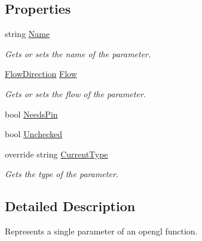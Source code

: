 \subsection*{Properties}
\begin{DoxyCompactItemize}
\item 
string \hyperlink{class_bind_1_1_structures_1_1_parameter_a10ddab5e51ff1530739413a4a1db5443}{Name}
\begin{DoxyCompactList}\small\item\em Gets or sets the name of the parameter. \item\end{DoxyCompactList}\item 
\hyperlink{class_bind_1_1_structures_1_1_parameter_a610a669b105a837fccb10d1869ea3876}{FlowDirection} \hyperlink{class_bind_1_1_structures_1_1_parameter_a512093b92ac7b310fb69abdf74e91319}{Flow}
\begin{DoxyCompactList}\small\item\em Gets or sets the flow of the parameter. \item\end{DoxyCompactList}\item 
bool \hyperlink{class_bind_1_1_structures_1_1_parameter_a8da6ababf2a23a25ff2f010525a38979}{NeedsPin}
\item 
bool \hyperlink{class_bind_1_1_structures_1_1_parameter_ac0bc7f8e84e39a405942e1fecd139153}{Unchecked}
\item 
override string \hyperlink{class_bind_1_1_structures_1_1_parameter_ae1988456271db83da3197856b8ac88a8}{CurrentType}
\begin{DoxyCompactList}\small\item\em Gets the type of the parameter. \item\end{DoxyCompactList}\end{DoxyCompactItemize}


\subsection{Detailed Description}
Represents a single parameter of an opengl function. 

